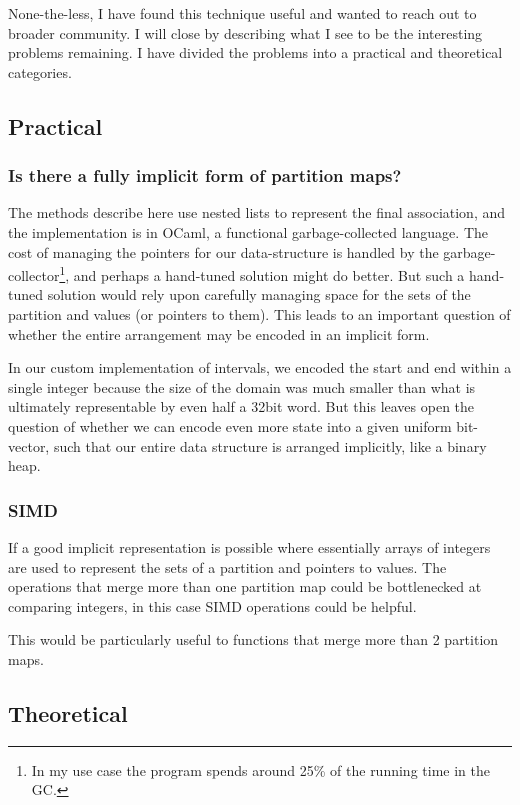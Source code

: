 \documentclass{article}
\begin{document}
None-the-less, I have found this technique useful and wanted to reach out to
broader community.
I will close by describing what I see to be the interesting problems remaining.
I have divided the problems into a practical and theoretical categories.

\subsection{Practical}
\subsubsection{Is there a fully implicit form of partition maps?}

The methods describe here use nested lists to represent the final association,
and the implementation is in OCaml\cite{ocaml-manual},
a functional garbage-collected language.
The cost of managing the pointers for our data-structure is handled by the
garbage-collector\footnote{
  In my use case the program spends around 25\% of the running time in the GC.},
and perhaps a hand-tuned solution might do better.
But such a hand-tuned solution would rely upon carefully managing space for
the sets of the partition and values (or pointers to them).
This leads to an important question of whether the entire arrangement may be
encoded in an implicit form.

In our custom implementation of intervals, we encoded the start and end
within a single integer because the size of the domain was much smaller
than what is ultimately representable by even half a 32bit word.
But this leaves open the question of whether we can encode even more state
into a given uniform bit-vector,
such that our entire data structure is arranged implicitly,
like a binary heap.

\subsubsection{SIMD}

If a good implicit representation is possible where essentially arrays of
integers are used to represent the sets of a partition and pointers to values.
The operations that merge more than one partition map could be bottlenecked
at comparing integers,
in this case SIMD operations could be helpful.

This would be particularly useful to functions that merge more than 2
partition maps.

\subsection{Theoretical}
\end{document}
